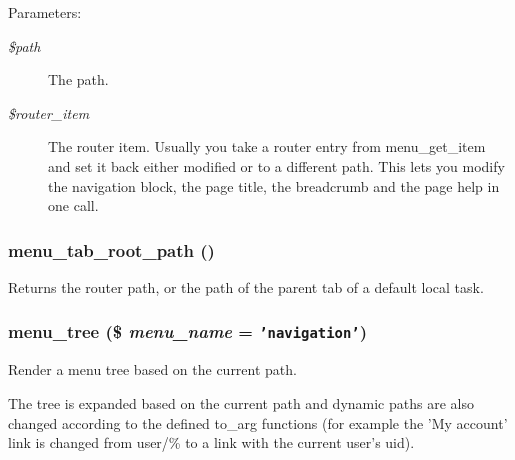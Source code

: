 \begin{Desc}
\item[Parameters:]
\begin{description}
\item[{\em \$path}]The path. \item[{\em \$router\_\-item}]The router item. Usually you take a router entry from menu\_\-get\_\-item and set it back either modified or to a different path. This lets you modify the navigation block, the page title, the breadcrumb and the page help in one call. \end{description}
\end{Desc}
\hypertarget{group__menu_gcf647362fc7151bbaa1dbe5568a0b6b5}{
\subsubsection[{menu\_\-tab\_\-root\_\-path}]{\setlength{\rightskip}{0pt plus 5cm}menu\_\-tab\_\-root\_\-path ()}}
\label{group__menu_gcf647362fc7151bbaa1dbe5568a0b6b5}


Returns the router path, or the path of the parent tab of a default local task. \hypertarget{group__menu_ga43c3a496679a1cc16d02d76d0422752}{
\subsubsection[{menu\_\-tree}]{\setlength{\rightskip}{0pt plus 5cm}menu\_\-tree (\$ {\em menu\_\-name} = {\tt 'navigation'})}}
\label{group__menu_ga43c3a496679a1cc16d02d76d0422752}


Render a menu tree based on the current path.

The tree is expanded based on the current path and dynamic paths are also changed according to the defined to\_\-arg functions (for example the 'My account' link is changed from user/\% to a link with the current user's uid).


